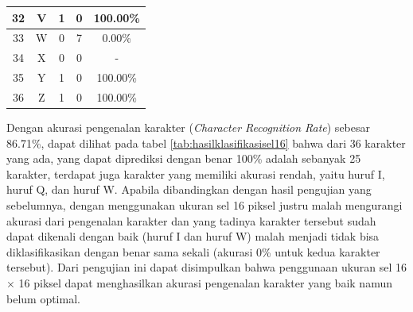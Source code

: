 \begin{longtable}[c]{|c|c|c|c|c|}
	32           & V                 & 1                       & 0                       &100.00\%            \\ \hline
	33           & W                 & 0                       & 7                       &0.00\%            \\ \hline
	34           & X                 & 0                       & 0                       & -            \\ \hline
	35           & Y                 & 1                       & 0                       &100.00\%            \\ \hline
	36           & Z                 & 1                       & 0                       &100.00\%            \\ \hline
\end{longtable}

\noindent Dengan akurasi pengenalan karakter (\textit{Character Recognition Rate}) sebesar 86.71\%, dapat dilihat pada tabel \ref{tab:hasilklasifikasisel16} bahwa dari 36  karakter yang ada, yang dapat diprediksi dengan benar 100\% adalah sebanyak 25 karakter, terdapat juga karakter yang memiliki akurasi rendah, yaitu huruf I, huruf Q, dan huruf W. Apabila dibandingkan dengan hasil pengujian yang sebelumnya, dengan menggunakan ukuran sel 16 piksel justru malah mengurangi akurasi dari pengenalan karakter dan yang tadinya karakter tersebut sudah dapat dikenali dengan baik (huruf I dan huruf W) malah menjadi tidak bisa diklasifikasikan dengan benar sama sekali (akurasi 0\% untuk kedua karakter tersebut). Dari pengujian ini dapat  disimpulkan bahwa penggunaan ukuran sel 16 $\times$ 16 piksel dapat menghasilkan akurasi pengenalan karakter yang baik namun belum optimal.\\

\newpage